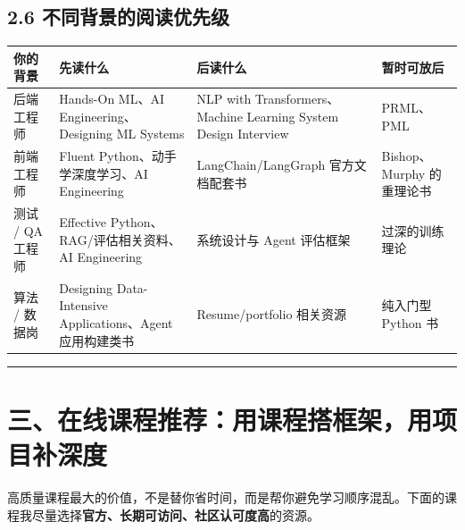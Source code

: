 \subsection{2.6 不同背景的阅读优先级}

\begingroup
\scriptsize
\setlength{\tabcolsep}{3pt}
\begin{longtable}{|p{}|p{}|p{}|p{}|}
\hline
你的背景 & 先读什么 & 后读什么 & 暂时可放后 \\ \hline
后端工程师 & Hands-On ML、AI Engineering、Designing ML Systems & NLP with Transformers、Machine Learning System Design Interview & PRML、PML \\ \hline
前端工程师 & Fluent Python、动手学深度学习、AI Engineering & LangChain/LangGraph 官方文档配套书 & Bishop、Murphy 的重理论书 \\ \hline
测试 / QA 工程师 & Effective Python、RAG/评估相关资料、AI Engineering & 系统设计与 Agent 评估框架 & 过深的训练理论 \\ \hline
算法 / 数据岗 & Designing Data-Intensive Applications、Agent 应用构建类书 & Resume/portfolio 相关资源 & 纯入门型 Python 书 \\ \hline
\end{longtable}
\endgroup

\bigskip\hrule\bigskip

\section{三、在线课程推荐：用课程搭框架，用项目补深度}

高质量课程最大的价值，不是替你省时间，而是帮你避免学习顺序混乱。下面的课程我尽量选择\textbf{官方、长期可访问、社区认可度高}的资源。


